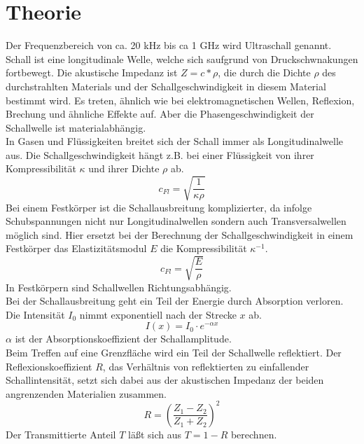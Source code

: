 \section{Theorie}
\label{sec:Theorie}
Der Frequenzbereich von ca. 20 kHz bis ca 1 GHz wird Ultraschall genannt.
Schall ist eine longitudinale Welle, welche sich saufgrund von Druckschwnakungen fortbewegt.
Die akustische Impedanz ist $Z = c * \rho$, die durch die Dichte $\rho$ des durchstrahlten Materials und der Schallgeschwindigkeit in diesem Material bestimmt wird.
Es treten, ähnlich wie bei elektromagnetischen Wellen, Reflexion, Brechung und ähnliche Effekte auf.
Aber die Phasengeschwindigkeit der Schallwelle ist materialabhängig. \\

In Gasen und Flüssigkeiten breitet sich der Schall immer als Longitudinalwelle aus.
Die Schallgeschwindigkeit hängt z.B. bei einer Flüssigkeit von ihrer Kompressibilität $\kappa$ und ihrer Dichte $\rho$ ab.
\begin{equation}
    c_{Fl} = \sqrt{\frac{1}{\kappa \rho}}
    \label{eqn:gl1}
\end{equation}
Bei einem Festkörper ist die Schallausbreitung komplizierter, da infolge Schubspannungen nicht nur Longitudinalwellen sondern auch Transversalwellen möglich sind.
Hier ersetzt bei der Berechnung der Schallgeschwindigkeit in einem Festkörper das Elastizitätsmodul $E$ die Kompressibilität $\kappa^{-1}$.
\begin{equation}
    c_{Fl} = \sqrt{\frac{E}{\rho}}
    \label{eqn:gl2}
\end{equation}
In Festkörpern sind Schallwellen Richtungsabhängig. \\

Bei der Schallausbreitung geht ein Teil der Energie durch Absorption verloren.
Die Intensität $I_0$ nimmt exponentiell nach der Strecke $x$ ab.
\begin{equation}
    I(x) = I_0 \cdot e^{-\alpha x}
    \label{eqn:gl3}
\end{equation}
$\alpha$ ist der Absorptionskoeffizient der Schallamplitude. \\

Beim Treffen auf eine Grenzfläche wird ein Teil der Schallwelle reflektiert.
Der Reflexionskoeffizient $R$, das Verhältnis von reflektierten zu einfallender Schallintensität, setzt sich dabei aus der akustischen Impedanz der beiden angrenzenden Materialien zusammen.
\begin{equation}
    R = \left(\frac{Z_1-Z_2}{Z_1+Z_2}\right)^2
\end{equation}
Der Transmittierte Anteil $T$ läßt sich aus $T = 1 − R$ berechnen.\\

